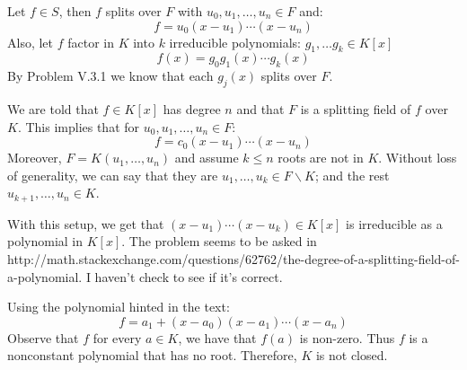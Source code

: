 Let $f\in S$, then $f$ splits over $F$ with $u_0,u_1,\ldots,u_n\in F$ and:
$$f=u_0(x-u_1)\cdots (x-u_n)$$
Also, let $f$ factor in $K$ into $k$ irreducible polynomials: $g_1,\ldots g_k\in K[x]$
$$f(x)=g_0g_1(x)\cdots g_{k}(x)$$
By Problem V.3.1 we know that each $g_j(x)$ splits over $F$.

We are told that $f\in K[x]$ has degree $n$ and that $F$ is a splitting field of $f$ over $K$. 
This implies that for $u_0,u_1,\ldots,u_n\in F$:
$$f=c_0(x-u_1)\cdots (x-u_n)$$
Moreover, $F=K(u_1,\ldots,u_n)$ and assume $k\leq n$ roots are not in $K$. 
Without loss of generality, we can say that they are $u_1,\ldots, u_k\in F\backslash K$; and the rest $u_{k+1},\ldots,u_n\in K$.

With this setup, we get that $(x-u_1)\cdots(x-u_k)\in K[x]$ is irreducible as a polynomial in $K[x]$. 
The problem seems to be asked in http://math.stackexchange.com/questions/62762/the-degree-of-a-splitting-field-of-a-polynomial. I haven't check to see if it's correct.

Using the polynomial hinted in the text:
$$f=a_1 + (x-a_0)(x-a_1)\cdots (x-a_n)$$
Observe that $f$ for every $a\in K$, we have that $f(a)$ is non-zero. Thus $f$ is  a nonconstant polynomial that has no root. Therefore, $K$ is not closed.
